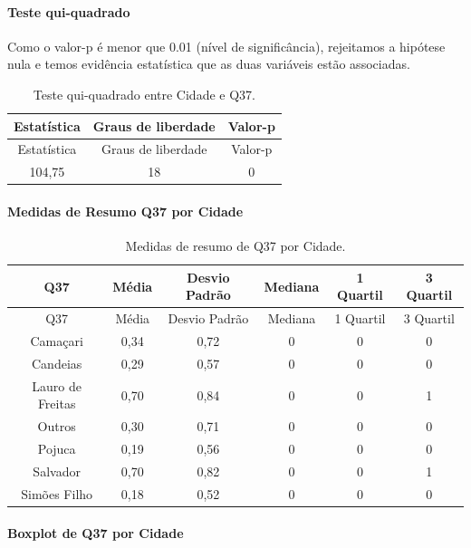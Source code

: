 \documentclass[]{article}
\let\oldparagraph\paragraph
\renewcommand{\paragraph}[1]{\oldparagraph{#1}\mbox{}}
\begin{document}
\hypertarget{teste-qui-quadrado-117}{%
\paragraph{Teste qui-quadrado}\label{teste-qui-quadrado-117}}

Como o valor-p é menor que 0.01 (nível de significância), rejeitamos a hipótese nula e temos evidência estatística que as duas variáveis estão associadas.

\begin{longtable}[]{@{}ccc@{}}
\caption{\label{tab:unnamed-chunk-1373}Teste qui-quadrado entre Cidade e Q37.}\tabularnewline
\toprule
Estatística & Graus de liberdade & Valor-p\tabularnewline
\midrule
\endfirsthead
\toprule
Estatística & Graus de liberdade & Valor-p\tabularnewline
\midrule
\endhead
104,75 & 18 & 0\tabularnewline
\bottomrule
\end{longtable}

\cleardoublepage

\hypertarget{medidas-de-resumo-q37-por-cidade}{%
\paragraph{Medidas de Resumo Q37 por Cidade}\label{medidas-de-resumo-q37-por-cidade}}

\begin{longtable}[]{@{}cccccc@{}}
\caption{\label{tab:unnamed-chunk-1374}Medidas de resumo de Q37 por Cidade.}\tabularnewline
\toprule
Q37 & Média & Desvio Padrão & Mediana & 1 Quartil & 3 Quartil\tabularnewline
\midrule
\endfirsthead
\toprule
Q37 & Média & Desvio Padrão & Mediana & 1 Quartil & 3 Quartil\tabularnewline
\midrule
\endhead
Camaçari & 0,34 & 0,72 & 0 & 0 & 0\tabularnewline
Candeias & 0,29 & 0,57 & 0 & 0 & 0\tabularnewline
Lauro de Freitas & 0,70 & 0,84 & 0 & 0 & 1\tabularnewline
Outros & 0,30 & 0,71 & 0 & 0 & 0\tabularnewline
Pojuca & 0,19 & 0,56 & 0 & 0 & 0\tabularnewline
Salvador & 0,70 & 0,82 & 0 & 0 & 1\tabularnewline
Simões Filho & 0,18 & 0,52 & 0 & 0 & 0\tabularnewline
\bottomrule
\end{longtable}

\hypertarget{boxplot-de-q37-por-cidade}{%
\paragraph{Boxplot de Q37 por Cidade}\label{boxplot-de-q37-por-cidade}}
\end{document}
